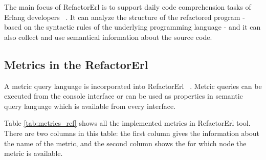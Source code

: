 The main focus of RefactorErl is to support daily code comprehension tasks of Erlang developers ~\cite{refactorerl}. It can analyze the structure of the refactored program - based on the syntactic rules of the underlying programming language - and it can also collect and use semantical information about the source code.

\subsection{Metrics in the RefactorErl}

A metric query language is incorporated into RefactorErl ~\cite{refactorerl}. Metric queries can be executed from the console interface or can be used as properties in semantic query language which is available from every interface.

Table \ref{tab:metrics_ref} shows all the implemented metrics in RefactorErl tool. There are two columns in this table: the first column gives the information about the name of the metric, and the second column shows the for which node the metric is available.

